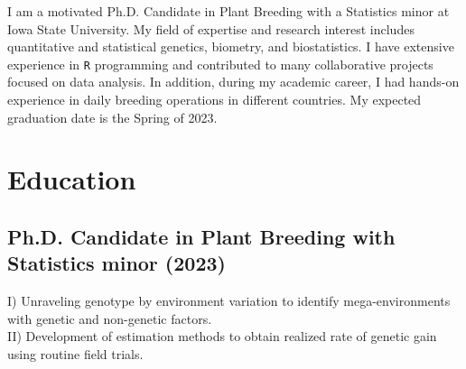 \documentclass[]{mdkrause_cv_openfont}
\begin{document}
%
%

%
%

%
%

\begin{minipage}[t]{1\textwidth} 


\vspace{1 mm}

I am a motivated Ph.D. Candidate in Plant Breeding with a Statistics minor at Iowa State University. My field of expertise and research interest includes quantitative and statistical genetics, biometry, and biostatistics. I have extensive experience in \texttt{R} programming and contributed to many collaborative projects focused on data analysis. In addition, during my academic career, I had hands-on experience in daily breeding operations in different countries. My expected graduation date is the Spring of 2023.



\section{Education} 

\sectionsep

\subsection{Ph.D. Candidate in Plant Breeding with Statistics minor (2023)}
 I) Unraveling genotype by environment variation to identify mega-environments with genetic and non-genetic factors. \\ 
\hspace{1.55 cm} II) Development of estimation methods to obtain realized rate of genetic gain using routine field trials.


\end{minipage}
\end{document}
